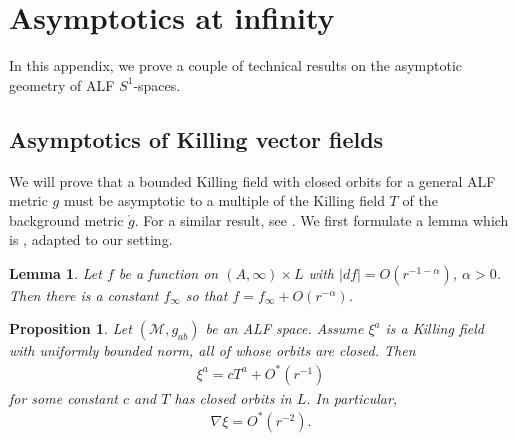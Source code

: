 \documentclass[a4paper,10pt,reqno]{amsart}
\newcommand{\cM}{\mathcal{M}}
\theoremstyle{plain}
\newtheorem{lemma}[thm]{Lemma}
\newtheorem{prop}[thm]{Proposition}
\newcommand{\gring}{\mathring{g}}
\numberwithin{equation}{section}
\begin{document}
\section{Asymptotics at infinity} \label{sec:asympinf}
In this appendix, we prove a couple of technical results on the asymptotic geometry of ALF $S^1$-spaces.  

\subsection{Asymptotics of Killing vector fields} \label{sec:asympKill}

We will prove that a bounded Killing field with closed orbits for a general ALF metric $g$ must be asymptotic to a multiple of the Killing field $T$ of the background metric $\gring$. For a similar result, see \cite[Proposition~2.1]{Beig-Chrusciel-96}. 
We first formulate a lemma which is \cite[Lemma,~Appendix~A]{Chrusciel-88}, adapted to our setting.

\begin{lemma} \label{lemma-piotr-limit}
Let $f$ be a function on $ (A,\infty) \times L$ with $|df| = O(r^{-1-\alpha})$, $\alpha >0$. Then there is a constant $f_\infty$ so that $f = f_\infty + O(r^{-\alpha})$. 
\end{lemma}
\begin{prop} \label{prop-asymptotics-killing}
Let $(\cM, g_{ab})$ be an ALF space. Assume $\xi^a$ is a Killing field with uniformly bounded norm, all of whose orbits are closed. 
Then  
\begin{align} \label{eq:xiO*}
\xi^a = cT^a + O^*(r^{-1})
\end{align} 
for some constant $c$ and $T$ has closed orbits in $L$. In particular, 
\begin{align} \label{eq:nablaxiO*}
\nabla\xi = O^*(r^{-2}).
\end{align}  
\end{prop}
\end{document}
